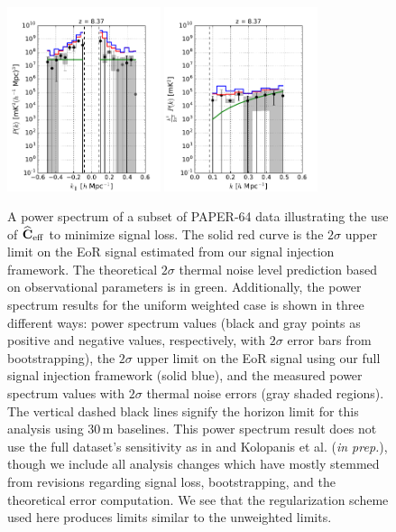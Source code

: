 \documentclass[preprint2,numberedappendix,tighten]{aastex6}  %
\begin{document}
\begin{figure}
	\centering
	\includegraphics[width=0.4\textwidth]{plots/ps1_data_add.pdf}
	\includegraphics[width=0.4\textwidth]{plots/ps2_data_add.pdf}
	\caption{A power spectrum of a subset of PAPER-64 data illustrating the use of $\widehat{\textbf{C}}_{\rm eff}$ to minimize signal loss. The solid red curve is the $2\sigma$ upper limit on the EoR signal estimated from our signal injection framework. The theoretical $2\sigma$ thermal noise level prediction based on observational parameters is in green. Additionally, the power spectrum results for the uniform weighted case is shown in three different ways: power spectrum values (black and gray points as positive and negative values, respectively, with $2\sigma$ error bars from bootstrapping), the $2\sigma$ upper limit on the EoR signal using our full signal injection framework (solid blue), and the measured power spectrum values with $2\sigma$ thermal noise errors (gray shaded regions). The vertical dashed black lines signify the horizon limit for this analysis using $30$\,m baselines. This power spectrum result does not use the full dataset's sensitivity as in  and Kolopanis et al. (\textit{in prep.}), though we include all analysis changes which have mostly stemmed from revisions regarding signal 
loss, bootstrapping, and the theoretical error computation. We see that the regularization scheme used here produces limits similar to the unweighted limits.}
	\label{fig:ps1_data}
\end{figure}
\end{document}
